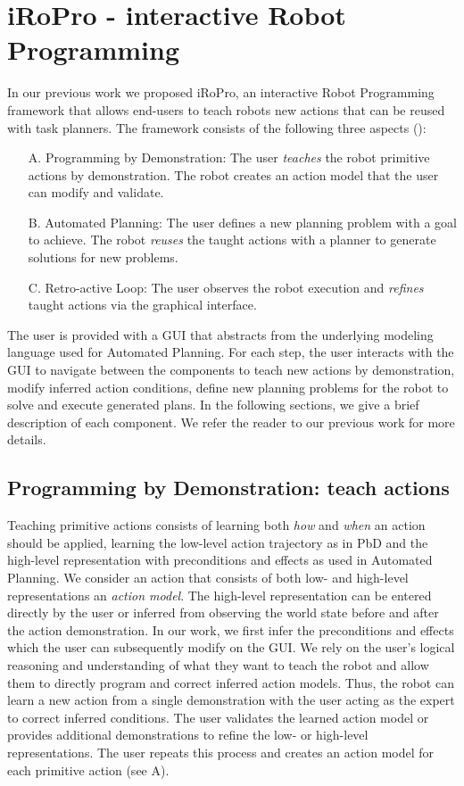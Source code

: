 \section{iRoPro - interactive Robot Programming} \label{sec:approach} 
In our previous work \cite{liang2017a} we proposed iRoPro, an interactive Robot Programming framework that allows end-users to teach robots new actions that can be reused with task planners.
The framework consists of the following three aspects (): 
\begin{enumerate}
	\item[A.]{Programming by Demonstration: The user \textit{teaches} the robot primitive actions by demonstration. The robot creates an action model that the user can modify and validate.}
	\item[B.]{Automated Planning: The user defines a new planning problem with a goal to achieve. The robot \textit{reuses} the taught actions with a planner to generate solutions for new problems.}
	\item[C.]{Retro-active Loop: The user observes the robot execution and \textit{refines} taught actions via the graphical interface.}
\end{enumerate}
The user is provided with a GUI that abstracts from the underlying modeling language used for Automated Planning.
For each step, the user interacts with the GUI to navigate between the components to teach new actions by demonstration, modify inferred action conditions, define new planning problems for the robot to solve and execute generated plans.
In the following sections, we give a brief description of each component.
We refer the reader to our previous work \cite{liang2017a,liang2017b} for more details. 

\subsection{Programming by Demonstration: teach actions}
Teaching primitive actions consists of learning both \textit{how} and \textit{when} an action should be applied, \ie learning the low-level action trajectory as in PbD and the high-level representation with preconditions and effects as used in Automated Planning.
We consider an action that consists of both low- and high-level representations an \textit{action model}.
The high-level representation can be entered directly by the user or inferred from observing the world state before and after the action demonstration.
In our work, we first infer the preconditions and effects which the user can subsequently modify on the GUI.
We rely on the user's logical reasoning and understanding of what they want to teach the robot and allow them to directly program and correct inferred action models.
Thus, the robot can learn a new action from a single demonstration with the user acting as the expert to correct inferred conditions.
The user validates the learned action model or provides additional demonstrations to refine the low- or high-level representations.
The user repeats this process and creates an action model for each primitive action (see A).

